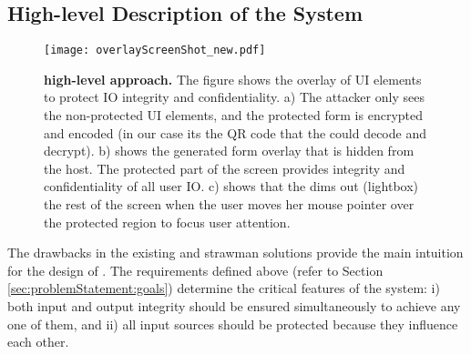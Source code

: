\iffalse
\subsection{Challenges}


Modern user interfaces (UIs) are diverse and hard to generalize, resulting in many possible ways to provide input and receiving output.  This makes the protection of IO integrity, and confidentiality is a particularly challenging task. For example, given a mouse movement and clicking on a button from the user, it is necessary to understand the user intention that corresponds to the mouse movements. 


The second challenge arises while ensuring IO confidentiality. For mouse input, hiding the mouse movement while keeping all the regular functionality intact is a challenging task as we do not consider large TCB-based solution such as a trusted hypervisor.


Apart from these functional challenges for implementation, there exist multiple attack vectors that we want to provide protection. 
\fi

\subsection{High-level Description of the System}

\begin{figure}[t]
\centering
\texttt{[image: overlayScreenShot\_new.pdf]}
\caption{\textbf{\name high-level approach.} The figure shows the \device overlay of UI elements to protect IO integrity and confidentiality. a) The attacker only sees the non-protected UI elements, and the protected form is encrypted and encoded (in our case its the QR code that the \device could decode and decrypt). b) shows the \device generated form overlay that is hidden from the host. The protected part of the screen provides integrity and confidentiality of all user IO. c) shows that the \device dims out (lightbox) the rest of the screen when the user moves her mouse pointer over the protected region to focus user attention.}
\spacesave
\label{fig:screenshot_1}
\end{figure}

 The drawbacks in the existing and strawman solutions provide the main intuition for the design of \name. The requirements defined above (refer to Section \ref{sec:problemStatement:goals}) determine the critical features of the system: 
i) both input and output integrity should be ensured simultaneously to achieve any one of them, and ii) all input sources should be protected because they influence each other. 

